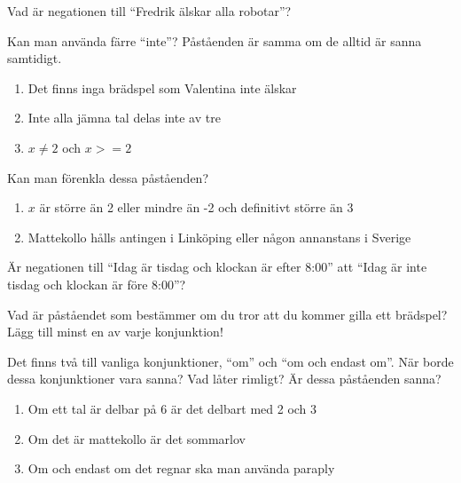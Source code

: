 \begin{problem}
	Vad är negationen till ``Fredrik älskar alla robotar''?
\end{problem}

\begin{problem}
	Kan man använda färre ``inte''? Påståenden är samma om de alltid är sanna samtidigt.
	\begin{enumerate}
		\item Det finns inga brädspel som Valentina inte älskar
		\item Inte alla jämna tal delas inte av tre
		\item \(x \neq 2\) och \(x>= 2\) 
	\end{enumerate}
\end{problem}

\begin{problem}
	Kan man förenkla dessa påståenden?
	\begin{enumerate}
		\item \(x\) är större än 2 eller mindre än -2 och definitivt större än 3
		\item Mattekollo hålls antingen i Linköping eller någon annanstans i Sverige
	\end{enumerate}
\end{problem}

\begin{problem}
	Är negationen till ``Idag är tisdag och klockan är efter 8:00'' att ``Idag är inte tisdag och klockan är före 8:00''?
\end{problem}

\begin{problem}
	Vad är påståendet som bestämmer om du tror att du kommer gilla ett brädspel? Lägg till minst en av varje konjunktion!
\end{problem}

\begin{problem}[Extra]
	Det finns två till vanliga konjunktioner, ``om'' och ``om och endast om''. När borde dessa konjunktioner vara sanna? Vad låter rimligt? Är dessa påståenden sanna?
	\begin{enumerate}
		\item Om ett tal är delbar på 6 är det delbart med 2 och 3
		\item Om det är mattekollo är det sommarlov
		\item Om och endast om det regnar ska man använda paraply
	\end{enumerate}
\end{problem}


